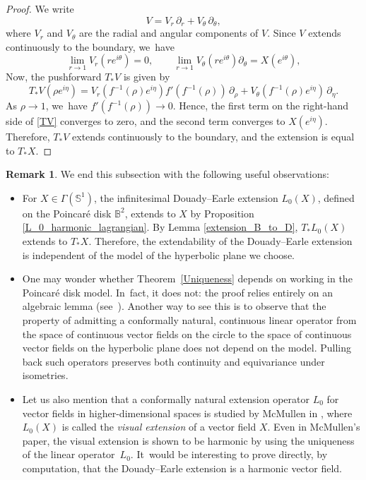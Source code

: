 \documentclass[10pt]{amsart}
\theoremstyle{plain}
\theoremstyle{definition}
\newtheorem{remark}[cor]{Remark}
\begin{document}
\begin{proof}
We write
\[
V = V_r\, \partial_r + V_\theta\, \partial_\theta,
\]
where \(V_r\) and \(V_\theta\) are the radial and angular components of \(V\). Since \(V\) extends continuously to the boundary, we~have
\[
\lim_{r \to 1} V_r(re^{i\theta}) = 0, \qquad \lim_{r \to 1} V_\theta(re^{i\theta})\partial_{\theta} = X(e^{i\theta}),
\]
Now, the pushforward \(T_*V\) is given by
\begin{equation}\label{TV}
T_*V(\rho e^{i\eta}) = V_r(f^{-1}(\rho)e^{i\eta}) f'(f^{-1}(\rho))\, \partial_\rho + V_\theta(f^{-1}(\rho)e^{i\eta})\, \partial_\eta.
\end{equation}
As \(\rho \to 1\), we~have \(f'(f^{-1}(\rho)) \to 0\). Hence, the first term on the right-hand side of \eqref{TV} converges to zero, and the second term converges to \(X(e^{i\eta})\). Therefore, \(T_*V\) extends continuously to the boundary, and the extension is equal to \(T_*X\).
\end{proof}
\begin{remark}
We end this subsection with the following useful observations:
\begin{itemize}
\item For \(X \in \Gamma(\mathbb{S}^1)\), the infinitesimal Douady–Earle extension \(L_0(X)\), defined on the Poincaré disk \(\mathbb{B}^2\), extends to \(X\) by Proposition \ref{L_0_harmonic_lagrangian}. By Lemma \ref{extension_B_to_D}, \(T_*L_0(X)\) extends to \(T_*X\). Therefore, the extendability of the Douady–Earle extension is independent of the model of the hyperbolic plane we choose.

\item One may wonder whether Theorem~\ref{Uniqueness} depends on working in the Poincaré disk model. In~fact, it does not: the proof relies entirely on an algebraic lemma (see~\cite[\S 3]{Uniqueness_of_operator_L}). Another way to see this is to observe that the property of admitting a conformally natural, continuous linear operator from the space of continuous vector fields on the circle to the space of continuous vector fields on the hyperbolic plane does not depend on the model. Pulling back such operators preserves both continuity and equivariance under isometries.

\item Let us also mention that a conformally natural extension operator \(L_0\) for vector fields in higher-dimensional spaces is studied by McMullen in \cite[App.\,B]{mullen}, where \(L_0(X)\) is called the \emph{visual extension} of a vector field \(X\). Even in McMullen's paper, the visual extension is shown to be harmonic by using the uniqueness of the linear operator~\(L_0 \). It~would be interesting to prove directly, by computation, that the Douady–Earle extension is a harmonic vector field.
\end{itemize}
\end{remark}
\end{document}
